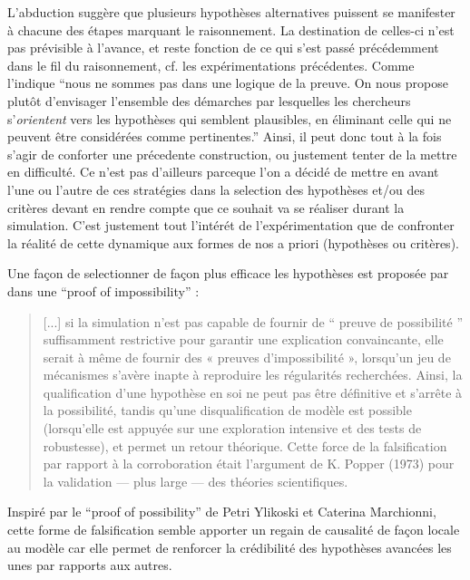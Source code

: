 


L'abduction suggère que plusieurs hypothèses alternatives puissent se manifester à chacune des étapes marquant le raisonnement. La destination de celles-ci n'est pas prévisible à l'avance, et reste fonction de ce qui s'est passé précédemment dans le fil du raisonnement, cf. les expérimentations précédentes. Comme l'indique \textcite{Besse2000} \enquote{nous ne sommes pas dans une logique de la preuve. On nous propose plutôt d'envisager l'ensemble des démarches par lesquelles les chercheurs s'\textit{orientent} vers les hypothèses qui semblent plausibles, en éliminant celle qui ne peuvent être considérées comme pertinentes.} Ainsi, il peut donc tout à la fois s'agir de conforter une précedente construction, ou justement tenter de la mettre en difficulté. Ce n'est pas d'ailleurs parceque l'on a décidé de mettre en avant l'une ou l'autre de ces stratégies dans la selection des hypothèses et/ou des critères devant en rendre compte que ce souhait va se réaliser durant la simulation. C'est justement tout l'intérét de l'expérimentation que de confronter la réalité de cette dynamique aux formes de nos a priori (hypothèses ou critères).

Une façon de selectionner de façon plus efficace les hypothèses est proposée par \textcite[300]{Cottineau2014b} dans une \foreignquote{english}{proof of impossibility} : 

\blockquote[{\cite[300]{Cottineau2014b}}]{[...] si la simulation n’est pas capable de fournir de \enquote{ preuve de possibilité } suffisamment restrictive pour garantir une explication convaincante, elle serait à même de fournir des « preuves d’impossibilité », lorsqu’un jeu de mécanismes s’avère inapte à reproduire les régularités recherchées. Ainsi, la qualification d’une hypothèse en soi ne peut pas être définitive et s’arrête à la possibilité, tandis qu’une disqualification de modèle est possible (lorsqu’elle est appuyée sur une exploration intensive et des tests de robustesse), et permet un retour théorique. Cette force de la falsification par rapport à la corroboration était l’argument de K. Popper (1973) pour la validation — plus large — des théories scientifiques.}

Inspiré par le \foreignquote{english}{proof of possibility} de Petri Ylikoski et Caterina Marchionni, cette forme de falsification  semble apporter un regain de causalité de façon locale au modèle car elle permet de renforcer la crédibilité des hypothèses avancées les unes par rapports aux autres.

